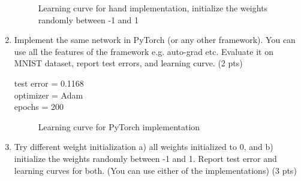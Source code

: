 \documentclass[10pt]{article}
\theoremstyle{definition}
\newenvironment{soln}{
    \leavevmode\color{blue}\ignorespaces
}{}
\begin{document}
\begin{enumerate}
\begin{soln}
\begin{figure}[H]
                \caption{Learning curve for hand implementation, initialize the weights randomly between -1 and 1}
                \label{Fig1.main}
              \end{figure}
          \end{soln}
    \item Implement the same network in PyTorch (or any other framework). You can use all the features of the framework e.g. auto-grad etc. Evaluate it on MNIST dataset, report test errors, and learning curve. (2 pts) \\
          \begin{soln}
              test error = 0.1168 \\
              optimizer = Adam \\
              epochs = 200 \\
              \begin{figure}[H]
                \centering  %
                \caption{Learning curve for PyTorch implementation}
                \label{Fig2.main}
              \end{figure}
          \end{soln}
    \item Try different weight initialization a) all weights initialized to 0, and b) initialize the weights randomly between -1 and 1. Report test error and learning curves for both. (You can use either of the implementations) (3 pts) \\

\end{enumerate}
\end{document}

